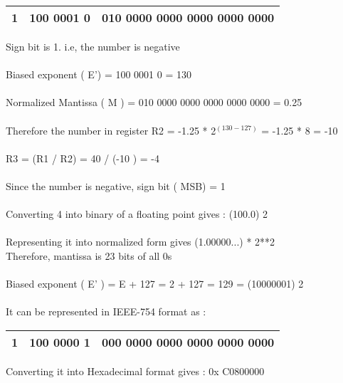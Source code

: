 \documentclass[journal,12pt,twocolumn]{IEEEtran}
\begin{document}
\begin{center}
\begin{tabular}{ |c|c|c| } 
 \hline
 1 & 100 0001 0 & 010 0000 0000 0000 0000 0000 \\ 
  
 \hline
\end{tabular}
\end{center}


Sign bit is 1. i.e, the number is negative
\\
\\
Biased exponent ( E') = 100 0001 0 = 130
\\
\\
Normalized Mantissa ( M ) = 010 0000 0000 0000 0000 0000 = 0.25
\\
\\
Therefore the number in register R2 = -1.25 * 2$ ^ ( 130-127)$ = -1.25 * 8 = -10
\\
\\
R3 = (R1 / R2) = 40 / (-10 ) = -4
\\
\\
Since the number is negative, sign bit ( MSB) = 1
\\
\\
Converting 4 into binary of a floating point gives : (100.0) 2
\\
\\
Representing it into normalized form gives (1.00000...) * 2**2
\\
Therefore, mantissa is 23 bits of all 0s
\\
\\
Biased exponent ( E' ) = E + 127 = 2 + 127 = 129 = (10000001) 2
\\
\\
It can be represented in IEEE-754 format as :
\\


\begin{center}
\begin{tabular}{ |c|c|c| } 
 \hline
 1 & 100 0000 1 & 000 0000 0000 0000 0000 0000 \\ 
  
 \hline
\end{tabular}
\end{center}


Converting it into Hexadecimal format gives : 0x C0800000
\end{document}
